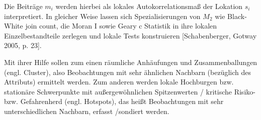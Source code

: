 Die Beiträge $m_i$ werden hierbei als lokales Autokorrelationsmaß der Lokation $s_i$ interpretiert. 
In gleicher Weise lassen sich Spezialisierungen von $M_2$ wie Black-White join count, die Moran I sowie Geary c Statistik in ihre lokalen Einzelbestandteile zerlegen 
und lokale Tests konstruieren [Schabenberger, Gotway 2005, p. 23]. 

Mit ihrer Hilfe sollen zum einen räumliche Anhäufungen und Zusammenballungen (engl. Cluster), also Beobachtungen mit sehr ähnlichen Nachbarn (bezüglich des Attributs) ermittelt werden. 
Zum anderen werden lokale Hochburgen bzw. stationäre Schwerpunkte mit außergewöhnlichen Spitzenwerten / kritische Risiko-bzw. Gefahrenherd (engl. Hotspots), 
das heißt Beobachtungen mit sehr unterschiedlichen Nachbarn, erfasst /sondiert werden.

